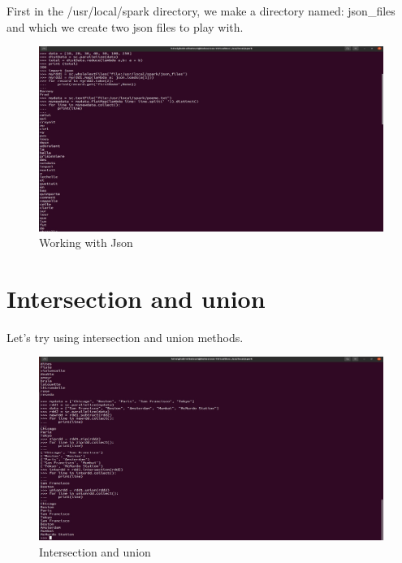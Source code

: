 \begin{spacing}{1.2}
\par First in the /usr/local/spark directory, we make a directory named: json_files and which we create two json files to play with.
\\
\begin{figure}[!htb] 
\begin{center} 
\includegraphics[width=1\linewidth]{Big_Data/Spark/Manipulating RDDs using pyspark/Working with Json} 
\end{center} 
\caption{Working with Json} 
\end{figure} 
\FloatBarrier

\section{Intersection and union}

\par Let's try using intersection and union methods.
\\
\begin{figure}[!htb] 
\begin{center} 
\includegraphics[width=1\linewidth]{Big_Data/Spark/Manipulating RDDs using pyspark/Intersection and union} 
\end{center} 
\caption{Intersection and union} 
\end{figure} 
\FloatBarrier


\FloatBarrier

\end{spacing}
